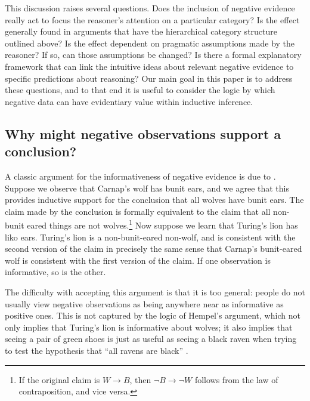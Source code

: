 \documentclass[authoryear,11pt]{elsarticle}
\begin{document}
This discussion raises several questions. Does the inclusion of negative evidence really act to focus the reasoner's attention on a particular category? Is the effect generally found in arguments that have the hierarchical category structure outlined above? Is the effect dependent on pragmatic assumptions made by the reasoner? If so, can those assumptions be changed? Is there a formal explanatory framework that can link the intuitive ideas about relevant negative evidence to specific predictions about reasoning? Our main goal in this paper is to address these questions, and to that end it is useful to consider the logic by which negative data can have evidentiary value within inductive inference.

\subsection{Why might negative observations support a conclusion?}

A classic argument for the informativeness of negative evidence is due to \citet{Hempel1945}. Suppose we observe that Carnap's wolf has bunit ears, and we agree that this provides inductive support for the conclusion that all wolves have bunit ears. The claim made by the conclusion is formally equivalent to the claim that all non-bunit eared things are not wolves.\footnote{If the original claim is $W \rightarrow B$, then $\neg B \rightarrow \neg W$ follows from the law of contraposition, and vice versa.} Now suppose we learn that Turing's lion has liko ears. Turing's lion is a non-bunit-eared non-wolf, and is consistent with the second version of the claim in precisely the same sense that Carnap's bunit-eared wolf is consistent with the first version of the claim. If one observation is informative, so is the other.

The difficulty with accepting this argument is that it is too general: people do not usually view negative observations as being anywhere near as informative as positive ones. This is not captured by the logic of Hempel's argument, which not only implies that Turing's lion is informative about wolves; it also implies that seeing a pair of green shoes is just as useful as seeing a black raven when trying to test the hypothesis that ``all ravens are black'' \citep[see, e.g.,][]{Nickerson1996}.
\end{document}

